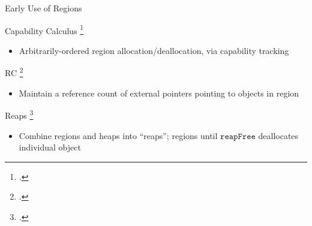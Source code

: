 \documentclass[aspectratio=169]{beamer}
\begin{document}
\begin{frame}{Early Use of Regions}
    \footnotesize{
Capability Calculus \footcite{crary_typed_1999}
    \begin{itemize}
        \item Arbitrarily-ordered region allocation/deallocation, via capability tracking 
    \end{itemize}
\pause
RC \footcite{gay_language_2001}
    \vspace{-0.1in}
   \begin{itemize}
     \item Maintain a reference count of external pointers pointing to objects in region %
   \end{itemize}
\pause
Reaps \footcite{berger_reconsidering_2002}
    \vspace{-0.1in}
   \begin{itemize}
     \item Combine regions and heaps into ``reaps''; regions until $\texttt{reapFree}$ deallocates individual object
   \end{itemize}

}
\end{frame}
\end{document}
